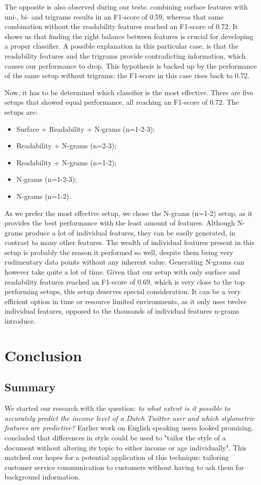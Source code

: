 \documentclass[
10pt, %
a4paper, %
oneside, %
headinclude,footinclude, %
] {book}%
\begin{document}
The opposite is also observed during our tests: combining surface features with uni-, bi- and trigrams results in an F1-score of 0.59, whereas that same combination without the readability features reached an F1-score of 0.72. It shows us that finding the right balance between features is crucial for developing a proper classifier. A possible explanation in this particular case, is that the readability features and the trigrams provide contradicting information, which causes our performance to drop. This hypothesis is backed up by the performance of the same setup without trigrams: the F1-score in this case rises back to 0.72.

Now, it has to be determined which classifier is the most effective. There are five setups that showed equal performance, all reaching an F1-score of 0.72. The setups are:
\begin{itemize}
\item Surface + Readability + N-grams (n=1-2-3);
\item Readability + N-grams (n=2-3);
\item Readability + N-grams (n=1-2);
\item N-grams (n=1-2-3);
\item N-grams (n=1-2).
\end{itemize}

As we prefer the most effective setup, we chose the N-grams (n=1-2) setup, as it provides the best performance with the least amount of features. Although N-grams produce a lot of individual features, they can be easily generated, in contrast to many other features. The wealth of individual features present in this setup is probably the reason it performed so well, despite them being very rudimentary data points without any inherent value.
Generating N-grams can however take quite a lot of time. Given that our setup with only surface and readability features reached an F1-score of 0.69, which is very close to the top performing setups, this setup deserves special consideration. It can be a very efficient option in time or resource limited environments, as it only uses twelve individual features, opposed to the thousands of individual features n-grams introduce.


\chapter{Conclusion}
\label{conclusion}
\section{Summary}
We started our research with the question: \textit{to what extent is it possible to accurately predict the income level of a Dutch Twitter user and which stylometric features are predictive?} Earlier work on English speaking users looked promising. \citet{flekova} concluded that differences in style could be used to "tailor the style of a document without altering its topic to either income or age individually". This matched our hopes for a potential application of this technique: tailoring customer service communication to customers without having to ask them for background information.
\end{document}

